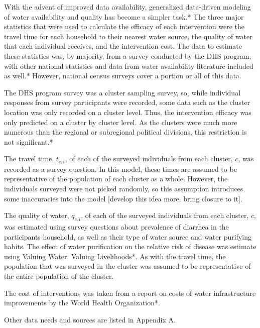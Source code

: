 



With the advent of improved data availability, generalized data-driven modeling of water availability and quality has become a simpler task.*
The three major statistics that were used to calculate the efficacy of each intervention were the travel time for each household to their nearest water source, the quality of water that each individual receives, and the intervention cost.
The data to estimate these statistics was, by majority, from a survey conducted by the DHS program, with other national statistics and data from water availability literature included as well.*
However, national census surveys cover a portion or all of this data.

The DHS program survey was a cluster sampling survey, so, while individual responses from survey participants were recorded, some data such as the cluster location was only recorded on a cluster level. 
Thus, the intervention efficacy was only predicted on a cluster by cluster level. 
As the clusters were much more numerous than the regional or subregional political divisions, this restriction is not significant.*

The travel time, $t_{c,i}$, of each of the surveyed individuals from each cluster, $c$, was recorded as a survey question.
In this model, these times are assumed to be representative of the population of each cluster as a whole.
However, the individuals surveyed were not picked randomly, so this assumption introduces some inaccuracies into the model [develop this idea more. bring closure to it].

The quality of water, $q_{c,i}$, of each of the surveyed individuals from each cluster, $c$, was estimated using survey questions about prevalence of diarrhea in the participants household, as well as their type of water source and water purifying habits. 
The effect of water purification on the relative risk of disease was estimate using Valuing Water, Valuing Livelihoods*. 
As with the travel time, the population that was surveyed in the cluster was assumed to be representative of the entire population of the cluster.

The cost of interventions was taken from a report on costs of water infrastructure improvements by the World Health Organization*.

Other data needs and sources are listed in Appendix A.